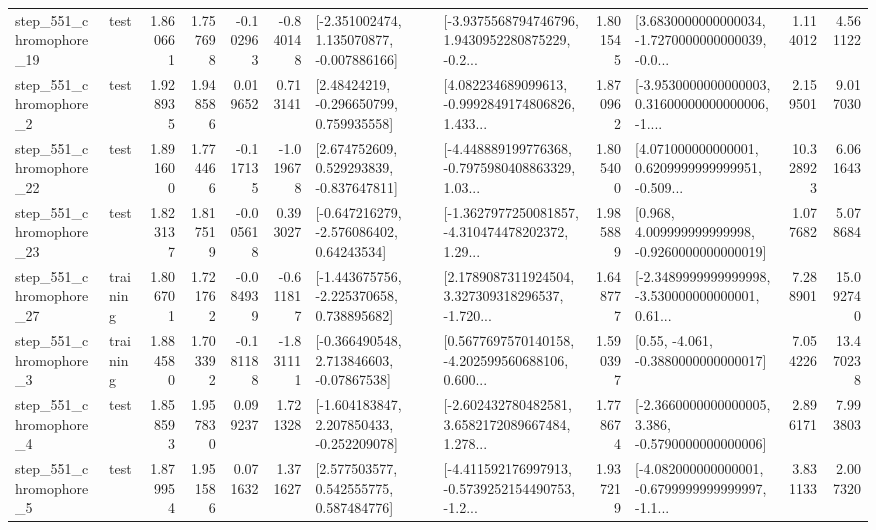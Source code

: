 \begin{tabular}{llrrrrllrlrr}
  step\_551\_chromophore\_19 &      test &      1.860661 &    1.757698 &     -0.102963 & -0.840148 &   [-2.351002474, 1.135070877, -0.007886166] &  [-3.9375568794746796, 1.9430952280875229, -0.2... &       1.801545 &  [3.6830000000000034, -1.7270000000000039, -0.0... &            1.114012 &          4.561122 \\
   step\_551\_chromophore\_2 &      test &      1.928935 &    1.948586 &      0.019652 &  0.713141 &     [2.48424219, -0.296650799, 0.759935558] &  [4.082234689099613, -0.9992849174806826, 1.433... &       1.870962 &  [-3.9530000000000003, 0.31600000000000006, -1.... &            2.159501 &          9.017030 \\
  step\_551\_chromophore\_22 &      test &      1.891600 &    1.774466 &     -0.117135 & -1.019678 &    [2.674752609, 0.529293839, -0.837647811] &  [-4.448889199776368, -0.7975980408863329, 1.03... &       1.805400 &  [4.071000000000001, 0.6209999999999951, -0.509... &           10.328923 &          6.061643 \\
  step\_551\_chromophore\_23 &      test &      1.823137 &    1.817519 &     -0.005618 &  0.393027 &    [-0.647216279, -2.576086402, 0.64243534] &  [-1.3627977250081857, -4.310474478202372, 1.29... &       1.985889 &    [0.968, 4.009999999999998, -0.9260000000000019] &            1.077682 &          5.078684 \\
  step\_551\_chromophore\_27 &  training &      1.806701 &    1.721762 &     -0.084939 & -0.611817 &   [-1.443675756, -2.225370658, 0.738895682] &  [2.1789087311924504, 3.327309318296537, -1.720... &       1.648777 &  [-2.3489999999999998, -3.530000000000001, 0.61... &            7.288901 &         15.092740 \\
   step\_551\_chromophore\_3 &  training &      1.884580 &    1.703392 &     -0.181188 & -1.831111 &    [-0.366490548, 2.713846603, -0.07867538] &  [0.5677697570140158, -4.202599560688106, 0.600... &       1.590397 &                [0.55, -4.061, -0.3880000000000017] &            7.054226 &         13.470238 \\
   step\_551\_chromophore\_4 &      test &      1.858593 &    1.957830 &      0.099237 &  1.721328 &   [-1.604183847, 2.207850433, -0.252209078] &  [-2.602432780482581, 3.6582172089667484, 1.278... &       1.778674 &  [-2.3660000000000005, 3.386, -0.5790000000000006] &            2.896171 &          7.993803 \\
   step\_551\_chromophore\_5 &      test &      1.879954 &    1.951586 &      0.071632 &  1.371627 &     [2.577503577, 0.542555775, 0.587484776] &  [-4.411592176997913, -0.5739252154490753, -1.2... &       1.937219 &  [-4.082000000000001, -0.6799999999999997, -1.1... &            3.831133 &          2.007320 \\

\end{tabular}
